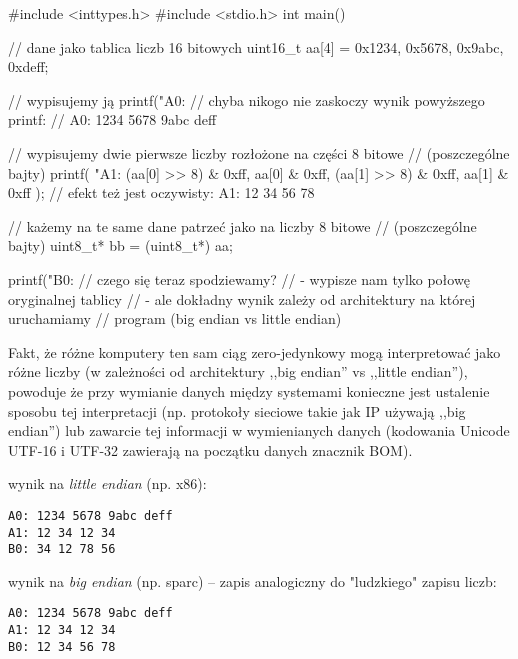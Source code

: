 \begin{CodeFrame*}[c]{}
#include <inttypes.h>
#include <stdio.h>
int main() {
    // dane jako tablica liczb 16 bitowych
    uint16_t aa[4] = {0x1234, 0x5678, 0x9abc, 0xdeff};
    
    // wypisujemy ją
    printf("A0: %
    // chyba nikogo nie zaskoczy wynik powyższego printf:
    //   A0: 1234 5678 9abc deff
    
    // wypisujemy dwie pierwsze liczby rozłożone na części 8 bitowe
    // (poszczególne bajty)
    printf(
        "A1: %
        (aa[0] >> 8) & 0xff, aa[0] & 0xff,
        (aa[1] >> 8) & 0xff, aa[1] & 0xff
    );
    // efekt też jest oczywisty:  A1: 12 34 56 78
    
    // każemy na te same dane patrzeć jako na liczby 8 bitowe
    // (poszczególne bajty)
    uint8_t* bb = (uint8_t*) aa;
    
    printf("B0: %
    // czego się teraz spodziewamy?
    //  - wypisze nam tylko połowę oryginalnej tablicy
    //  - ale dokładny wynik zależy od architektury na której uruchamiamy
    //    program (big endian vs little endian)
}
\end{CodeFrame*}

Fakt, że różne komputery ten sam ciąg zero-jedynkowy mogą interpretować jako różne liczby (w zależności od architektury ,,big endian'' vs ,,little endian''), powoduje że przy wymianie danych między systemami konieczne jest ustalenie sposobu tej interpretacji (np. protokoły sieciowe takie jak IP używają ,,big endian'') lub zawarcie tej informacji w wymienianych danych (kodowania Unicode UTF-16 i UTF-32 zawierają na początku danych znacznik BOM).

\begin{teacherOnly}
\begin{minipage}[t]{0.38\textwidth}
wynik na \emph{little endian} (np. x86):
\begin{Verbatim}
A0: 1234 5678 9abc deff
A1: 12 34 12 34
B0: 34 12 78 56
\end{Verbatim}
\end{minipage}
\hfill
\begin{minipage}[t]{0.58\textwidth}
wynik na \emph{big endian} (np. sparc) – zapis analogiczny do "ludzkiego" zapisu liczb:
\begin{Verbatim}
A0: 1234 5678 9abc deff
A1: 12 34 12 34
B0: 12 34 56 78
\end{Verbatim}
\end{minipage}
\end{teacherOnly}
